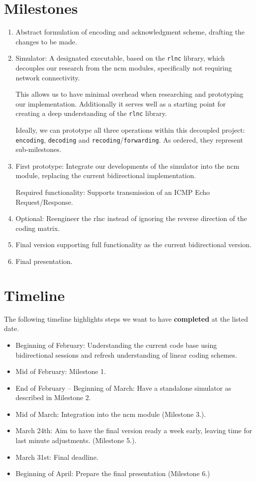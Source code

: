 \documentclass[a4paper, 11pt]{article}
\newcommand{\ilc}[1]{\texttt{#1}} %
\begin{document}
    \section{Milestones}\label{sec:milestones}
    \begin{enumerate}
        \item Abstract formulation of encoding and acknowledgment scheme, drafting the changes to be made.
        \item Simulator: A designated executable, based on the \ilc{rlnc} library, which decouples our
            research from the ncm modules, specifically not requiring network connectivity.

            This allows us to have minimal overhead when researching and prototyping our implementation.
            Additionally it serves well as a starting point for creating a deep understanding of the \ilc{rlnc} library.

            Ideally, we can prototype all three operations within this decoupled project:
            \ilc{encoding}, \ilc{decoding} and \ilc{recoding}/\ilc{forwarding}.
            As ordered, they represent sub-milestones.
        \item First prototype: Integrate our developments of the simulator into the ncm module,
            replacing the current bidirectional implementation.

            Required functionality: Supports transmission of an ICMP Echo Request/Response.
        \item Optional: Reengineer the rlnc instead of ignoring the reverse direction of the coding matrix.
        \item Final version supporting full functionality as the current bidirectional version.
        \item Final presentation.
    \end{enumerate}

    \section{Timeline}\label{sec:timeline}
    The following timeline highlights steps we want to have \textbf{completed} at the listed date.

    \begin{itemize}
        \item Beginning of February: Understanding the current code base using bidirectional sessions and refresh understanding of linear coding schemes.
        \item Mid of February: Milestone 1.
        \item End of February -- Beginning of March: Have a standalone simulator as described in Milestone 2.
        \item Mid of March: Integration into the ncm module (Milestone 3.).
        \item March 24th: Aim to have the final version ready a week early,
            leaving time for last minute adjustments. (Milestone 5.).
        \item March 31st: Final deadline.
        \item Beginning of April: Prepare the final presentation (Milestone 6.)
    \end{itemize}
\end{document}
